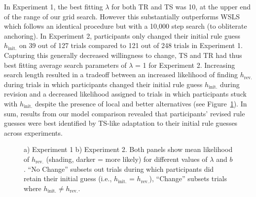 \documentclass[doc,natbib,floatsintext]{apa7}
\newcommand{\hr}{h_{\mathrm{rev.}}}
\newcommand{\hi}{h_{\mathrm{init.}}}
\begin{document}
In Experiment 1, the best fitting $\lambda$ for both TR and TS was 10, at the upper end of the range of our grid search. However this substantially outperforms WSLS which follows an identical procedure but with a 10,000 step search (to obliterate anchoring). In Experiment 2, participants only changed their initial rule guess $\hi$ on 39 out of 127 trials compared to 121 out of 248 trials in Experiment 1. Capturing this generally decreased willingness to change, TS and TR had thus best fitting average search parameters of $\lambda$ = 1 for Experiment 2. Increasing search length resulted in a tradeoff between an increased likelihood of finding $\hr$ during trials in which participants changed their initial rule guess $\hi$ during revision and a decreased likelihood assigned to trials in which participants stuck with $\hi$ despite the presence of local and better alternatives (see Figure~\ref{fig:fig_8_tr_ts_h_rev}). In sum, results from our model comparison revealed that participants' revised rule guesses were best identified by TS-like adaptation to their initial rule guesses across experiments.

\begin{figure}[!ht]
    \begin{center}
    \end{center}
    \caption{a) Experiment 1 b) Experiment 2. Both panels show mean likelihood of $\hr$ (shading, darker = more likely) for different values of $\lambda$ and $b$. ``No Change'' subsets out trials during which participants did retain their initial guess (i.e., $\hi$ = $\hr$), ``Change'' subsets trials where $\hi\neq\hr$.
    }
    \label{fig:fig_8_tr_ts_h_rev}
\end{figure}
\end{document}
